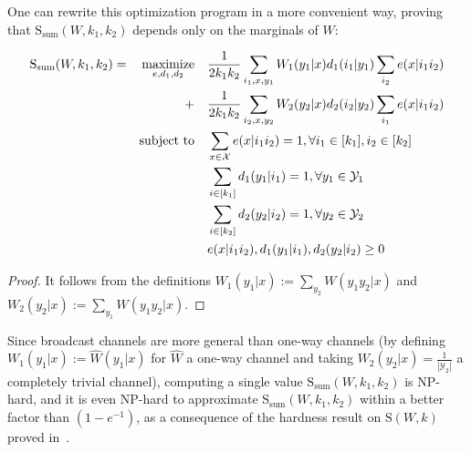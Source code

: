 One can rewrite this optimization program in a more convenient way, proving that $\mathrm{S}_{\text{sum}}(W,k_1,k_2)$ depends only on the marginals of $W$:
\begin{proposition}
  \begin{equation}
  \begin{aligned}
    \mathrm{S}_{\text{sum}}(W,k_1,k_2) = &&\underset{e,d_1,d_2}{\operatorname{\text{maximize}}} &&& \frac{1}{2k_1k_2}\sum_{i_1,x,y_1} W_1(y_1|x)d_1(i_1|y_1)\sum_{i_2} e(x|i_1i_2)\\
    &&+&&& \frac{1}{2k_1k_2}\sum_{i_2,x,y_2} W_2(y_2|x)d_2(i_2|y_2)\sum_{i_1} e(x|i_1i_2)\\
    &&\operatorname{\text{subject to}} &&& \sum_{x \in \mathcal{X}} e(x|i_1i_2) = 1, \forall i_1 \in [k_1], i_2 \in [k_2]\\
    &&&&& \sum_{i \in [k_1]} d_1(y_1|i_1) = 1, \forall y_1 \in \mathcal{Y}_1\\
    &&&&& \sum_{i \in [k_2]} d_2(y_2|i_2) = 1, \forall y_2 \in \mathcal{Y}_2\\
    &&&&& e(x|i_1i_2), d_1(y_1|i_1), d_2(y_2|i_2) \geq 0
  \end{aligned}
  \end{equation}
\end{proposition}

\begin{proof}
  It follows from the definitions $W_1(y_1|x) := \sum_{y_2} W(y_1y_2|x)$ and $W_2(y_2|x) := \sum_{y_1} W(y_1y_2|x)$.
\end{proof}


Since broadcast channels are more general than one-way channels (by defining $W_1(y_1|x):=\hat{W}(y_1|x)$ for $\hat{W}$ a one-way channel and taking $W_2(y_2|x)=\frac{1}{|\mathcal{Y}_2|}$ a completely trivial channel), computing a single value $\mathrm{S}_{\text{sum}}(W,k_1,k_2)$ is \textrm{NP}-hard, and it is even \textrm{NP}-hard to approximate $\mathrm{S}_{\text{sum}}(W,k_1,k_2)$ within a better factor than $\left(1-e^{-1}\right)$, as a consequence of the hardness result on $\mathrm{S}(W,k)$ proved in~\cite{BF18}.

